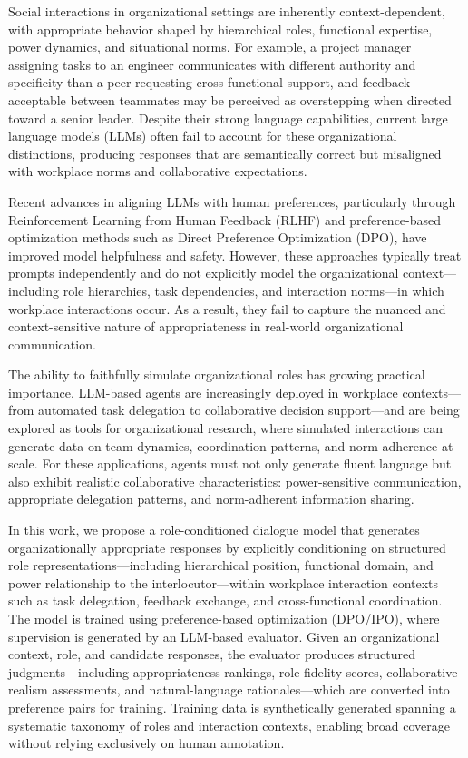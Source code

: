 \documentclass{article}
\begin{document}
Social interactions in organizational settings are inherently context-dependent, with appropriate behavior shaped by hierarchical roles, functional expertise, power dynamics, and situational norms. For example, a project manager assigning tasks to an engineer communicates with different authority and specificity than a peer requesting cross-functional support, and feedback acceptable between teammates may be perceived as overstepping when directed toward a senior leader. Despite their strong language capabilities, current large language models (LLMs) often fail to account for these organizational distinctions, producing responses that are semantically correct but misaligned with workplace norms and collaborative expectations.

Recent advances in aligning LLMs with human preferences, particularly through Reinforcement Learning from Human Feedback (RLHF) and preference-based optimization methods such as Direct Preference Optimization (DPO), have improved model helpfulness and safety. However, these approaches typically treat prompts independently and do not explicitly model the organizational context---including role hierarchies, task dependencies, and interaction norms---in which workplace interactions occur. As a result, they fail to capture the nuanced and context-sensitive nature of appropriateness in real-world organizational communication.

The ability to faithfully simulate organizational roles has growing practical importance. LLM-based agents are increasingly deployed in workplace contexts---from automated task delegation to collaborative decision support---and are being explored as tools for organizational research, where simulated interactions can generate data on team dynamics, coordination patterns, and norm adherence at scale. For these applications, agents must not only generate fluent language but also exhibit realistic collaborative characteristics: power-sensitive communication, appropriate delegation patterns, and norm-adherent information sharing.

In this work, we propose a role-conditioned dialogue model that generates organizationally appropriate responses by explicitly conditioning on structured role representations---including hierarchical position, functional domain, and power relationship to the interlocutor---within workplace interaction contexts such as task delegation, feedback exchange, and cross-functional coordination. The model is trained using preference-based optimization (DPO/IPO), where supervision is generated by an LLM-based evaluator. Given an organizational context, role, and candidate responses, the evaluator produces structured judgments---including appropriateness rankings, role fidelity scores, collaborative realism assessments, and natural-language rationales---which are converted into preference pairs for training. Training data is synthetically generated spanning a systematic taxonomy of roles and interaction contexts, enabling broad coverage without relying exclusively on human annotation.
\end{document}
